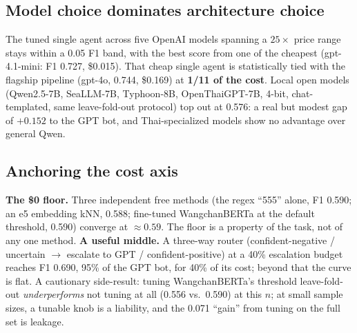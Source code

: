 \documentclass[10pt]{article}
\begin{document}
\subsection{Model choice dominates architecture choice}
The tuned single agent across five OpenAI models spanning a $25\times$ price range stays within a
0.05 F1 band, with the best score from one of the cheapest (gpt-4.1-mini: F1 0.727, \$0.015). That
cheap single agent is statistically tied with the flagship pipeline (gpt-4o, 0.744, \$0.169) at
\textbf{1/11 of the cost}. Local open models (Qwen2.5-7B, SeaLLM-7B, Typhoon-8B, OpenThaiGPT-7B,
4-bit, chat-templated, same leave-fold-out protocol) top out at 0.576: a real but modest gap of
$+0.152$ to the GPT bot, and Thai-specialized models show no advantage over general Qwen.

\subsection{Anchoring the cost axis}
\textbf{The \$0 floor.} Three independent free methods (the regex ``555'' alone, F1 0.590; an e5
embedding kNN, 0.588; fine-tuned WangchanBERTa at the default threshold, 0.590) converge at
$\approx 0.59$. The floor is a property of the task, not of any one method.
\textbf{A useful middle.} A three-way router (confident-negative / uncertain $\to$ escalate to GPT /
confident-positive) at a 40\% escalation budget reaches F1 0.690, 95\% of the GPT bot, for 40\% of
its cost; beyond that the curve is flat. A cautionary side-result: tuning WangchanBERTa's threshold
leave-fold-out \emph{underperforms} not tuning at all (0.556 vs.\ 0.590) at this $n$; at small
sample sizes, a tunable knob is a liability, and the 0.071 ``gain'' from tuning on the full set is
leakage.
\end{document}
